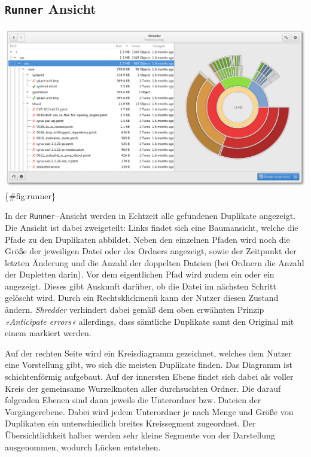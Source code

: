 \documentclass[11pt,ngerman,toc=listof,index=totoc]{scrreprt}
\newcommand{\cmark}{\ding{51}}%
\newcommand{\xmark}{\ding{55}}%
\begin{document}
\subsection{\texorpdfstring{\texttt{Runner}
Ansicht}{Runner Ansicht}}\label{runner-ansicht}

\includegraphics{docs/pics/gui_runner.png} \{\#fig:runner\}

In der \texttt{Runner}--Ansicht werden in Echtzeit alle gefundenen
Duplikate angezeigt. Die Ansicht ist dabei zweigeteilt: Links findet
sich eine Baumansicht, welche die Pfade zu den Duplikaten abbildet.
Neben den einzelnen Pfaden wird noch die Größe der jeweiligen Datei oder
des Ordners angezeigt, sowie der Zeitpunkt der letzten Änderung und die
Anzahl der doppelten Dateien (bei Ordnern die Anzahl der Dupletten
darin). Vor dem eigentlichen Pfad wird zudem ein
\textcolor{green}{\cmark} oder ein \textcolor{red}{\xmark} angezeigt.
Dieses gibt Auskunft darüber, ob die Datei im nächsten Schritt gelöscht
wird. Durch ein Rechtsklickmenü kann der Nutzer diesen Zustand ändern.
\emph{Shredder} verhindert dabei gemäß dem oben erwähnten Prinzip
\emph{»Anticipate errors«} allerdings, dass sämtliche Duplikate samt den
Original mit einem \textcolor{red}{\xmark} markiert werden.

Auf der rechten Seite wird ein Kreisdiagramm gezeichnet, welches dem
Nutzer eine Vorstellung gibt, wo sich die meisten Duplikate finden. Das
Diagramm ist schichtenförmig aufgebaut. Auf der innersten Ebene findet
sich dabei als voller Kreis der gemeinsame Wurzelknoten aller
durchsuchten Ordner. Die darauf folgenden Ebenen sind dann jeweils die
Unterordner bzw. Dateien der Vorgängerebene. Dabei wird jedem
Unterordner je nach Menge und Größe von Duplikaten ein unterschiedlich
breites Kreissegment zugeordnet. Der Übersichtlichkeit halber werden
sehr kleine Segmente von der Darstellung ausgenommen, wodurch Lücken
entstehen.
\end{document}
